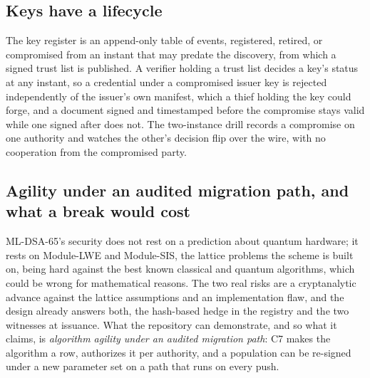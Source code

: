 \subsection{Keys have a lifecycle}

The key register is an append-only table of events, registered, retired, or compromised from an
instant that may predate the discovery, from which a signed trust list is published. A verifier
holding a trust list decides a key's status at any instant, so a credential under a compromised
issuer key is rejected independently of the issuer's own manifest, which a thief holding the key
could forge, and a document signed and timestamped before the compromise stays valid while one
signed after does not. The two-instance drill records a compromise on one authority and watches the
other's decision flip over the wire, with no cooperation from the compromised party. \sImpl

\subsection{Agility under an audited migration path, and what a break would cost}

ML-DSA-65's security does not rest on a prediction about quantum hardware; it rests on Module-LWE and Module-SIS, the lattice problems the scheme is built on, being hard
against the best known classical and quantum algorithms, which could be wrong for mathematical
reasons. The two real risks are a cryptanalytic advance against the lattice assumptions and an
implementation flaw, and the design already answers both, the hash-based hedge in the registry and
the two witnesses at issuance. What the repository can demonstrate, and so what it claims, is \emph{algorithm agility under an audited migration path}: C7 makes the
algorithm a row,  authorizes it per authority, and a population can be
re-signed under a new parameter set on a path that runs on every push. \sImpl

